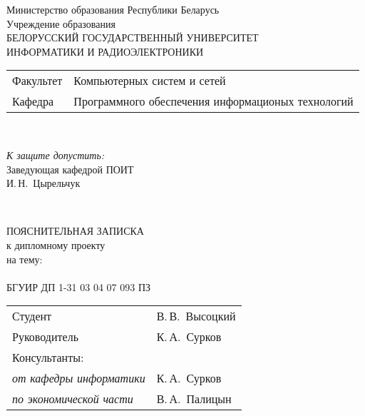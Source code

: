 \begin{titlepage}
  \begin{center}
    Министерство образования Республики Беларусь\\[1em]
    Учреждение образования\\
    БЕЛОРУССКИЙ ГОСУДАРСТВЕННЫЙ УНИВЕРСИТЕТ \\
    ИНФОРМАТИКИ И РАДИОЭЛЕКТРОНИКИ\\[1em]

    \begin{minipage}{\textwidth}
      \begin{flushleft}
        \begin{tabular}{ l l }
          Факультет & Компьютерных систем и сетей\\
          Кафедра   & Программного обеспечения информационых технологий
        \end{tabular}
      \end{flushleft}
    \end{minipage}\\[1em]

    \begin{flushright}
      \begin{minipage}{0.4\textwidth}
        \textit{К защите допустить:}\\[0.8em]
        Заведующая кафедрой ПОИТ\\[0.45em]
        \underline{\hspace*{2.8cm}} И.\,Н.~Цырельчук
      \end{minipage}\\[2.2em]
    \end{flushright}

    {ПОЯСНИТЕЛЬНАЯ ЗАПИСКА}\\
    {к дипломному проекту}\\
    {на тему:}\\[1em]
    \textbf{\large \thesis{}}\\[1em]


    {БГУИР ДП 1-31 03 04 07 093 ПЗ}\\[2em]
    
    \begin{tabular}{ p{}p{} }
      Студент & В.\,В.~Высоцкий \\
      Руководитель & К.\,А.~Сурков \\
      Консультанты: &\\
      \hspace*{3ex}\emph{от кафедры информатики} & К.\,А.~Сурков \\
      \hspace*{3ex}\emph{по экономической части} & В.\,А.~Палицын \\


\end{tabular}
\end{center}
\end{titlepage}
